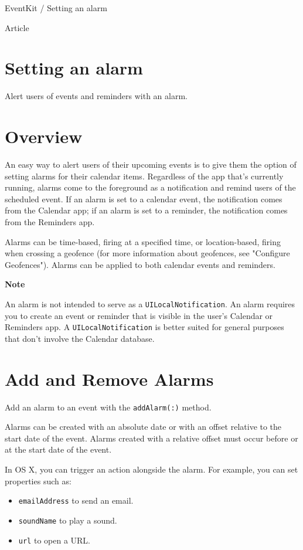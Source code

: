 \documentclass{article}
\title{}
\author{}
\date{}
\begin{document}
EventKit / Setting an alarm

Article

\section*{Setting an alarm}

Alert users of events and reminders with an alarm.

\section*{Overview}

An easy way to alert users of their upcoming events is to give them the option of setting alarms for their calendar items. Regardless of the app that's currently running, alarms come to the foreground as a notification and remind users of the scheduled event. If an alarm is set to a calendar event, the notification comes from the Calendar app; if an alarm is set to a reminder, the notification comes from the Reminders app.

Alarms can be time-based, firing at a specified time, or location-based, firing when crossing a geofence (for more information about geofences, see "Configure Geofences"). Alarms can be applied to both calendar events and reminders.

\textbf{Note}

An alarm is not intended to serve as a \texttt{UILocalNotification}. An alarm requires you to create an event or reminder that is visible in the user's Calendar or Reminders app. A \texttt{UILocalNotification} is better suited for general purposes that don't involve the Calendar database.

\section*{Add and Remove Alarms}

Add an alarm to an event with the \texttt{addAlarm(:)} method.

Alarms can be created with an absolute date or with an offset relative to the start date of the event. Alarms created with a relative offset must occur before or at the start date of the event.

In OS X, you can trigger an action alongside the alarm. For example, you can set properties such as:
\begin{itemize}
    \item \texttt{emailAddress} to send an email.
    \item \texttt{soundName} to play a sound.
    \item \texttt{url} to open a URL.
\end{itemize}
\end{document}
